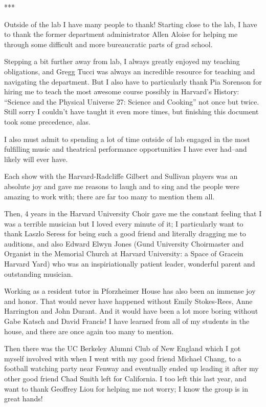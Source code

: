 \begin{center}
   ***
\end{center}

Outside of the lab I have many people to thank!  Starting close to the lab, I have to thank the former department administrator Allen Aloise for helping me through some difficult and more bureaucratic parts of grad school.

Stepping a bit further away from lab, I always greatly enjoyed my teaching obligations, and Gregg Tucci was always an incredible resource for teaching and navigating the department.  But I also have to particularly thank Pia Sorenson for hiring me to teach the most awesome course possibly in Harvard's History: ``Science and the Physical Universe 27: Science and Cooking'' not once but twice.  Still sorry I couldn't have taught it even more times, but finishing this document took some precedence, alas.


I also must admit to spending a lot of time outside of lab engaged in the most fulfilling music and theatrical performance opportunities I have ever had--and likely will ever have.

Each show with the Harvard-Radcliffe Gilbert and Sullivan players was an absolute joy and gave me reasons to laugh and to sing and the people were amazing to work with; there are far too many to mention them all.

Then, 4 years in the Harvard University Choir gave me the constant feeling that I was a terrible musician but I loved every minute of it; I particularly want to thank Laszlo Seress for being such a good friend and literally dragging me to auditions, and also Edward Elwyn Jones (Gund University Choirmaster and Organist in the Memorial Church at Harvard University: a Space of Grace\textregistered in Harvard Yard) who was an inspiriationally patient leader, wonderful parent and outstanding musician.

Working as a resident tutor in Pforzheimer House has also been an immense joy and honor.  That would never have happened without Emily Stokes-Rees, Anne Harrington and John Durant.  And it would have been a lot more boring without Gabe Katsch and David Francis!  I have learned from all of my students in the house, and there are once again too many to mention.

Then there was the UC Berkeley Alumni Club of New England which I got myself involved with when I went with my good friend Michael Chang, to a football watching party near Fenway and eventually ended up leading it after my other good friend Chad Smith left for California.  I too left this last year, and want to thank Geoffrey Liou for helping me not worry; I know the group is in great hands!


